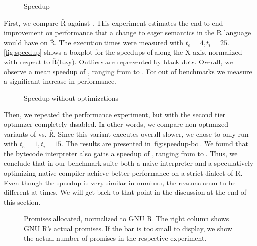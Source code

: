 \documentclass[review,creen,acmsmall]{acmart}
\renewcommand{\Rsh}{{\sf\v R}\xspace}
\begin{document}
\begin{figure}[h]
  \centering 
  \caption{Speedup} \label{fig:speedup}
\end{figure}

First, we compare \Rsh against \rshstrict. This experiment estimates the
end-to-end improvement on performance that a change to eager semantics in the R
language would have on \Rsh. The execution times were measured with $t_e = 4,
t_i = 25$. \autoref{fig:speedup} shows a boxplot for the speedups of \rshstrict
along the X-axis, normalized with respect to \Rsh (lazy). Outliers are
represented by black dots. Overall, we observe a mean speedup of
\speedupRshStrict, ranging from \speedupRshStrictMin to \speedupRshStrictMax.
For \speedupRshStrictSignificant out of \benchmarkSuiteSize benchmarks we
measure a significant increase in performance.
%
\begin{figure}[h]
  \centering
  
  \caption{Speedup without optimizations}
  \label{fig:speedup-bc}
\end{figure}
%

Then, we repeated the performance experiment, but with the second tier optimizer
completely disabled. In other words, we compare non optimized variants of
\rshstrict vs. \Rsh. Since this variant executes overall \rshBCSlowdown slower,
we chose to only run with $t_e = 1, t_i = 15$. The results are presented in
\autoref{fig:speedup-bc}. We found that the bytecode interpreter also gains a
speedup of \speedupBCRshStrict, ranging from \speedupBCRshStrictMin to
\speedupBCRshStrictMax.
%
Thus, we conclude that in our benchmark suite both a naive interpreter and a
speculatively optimizing native compiler achieve better performance on a strict
dialect of R. Even though the speedup is very similar in numbers, the reasons
seem to be different at times. We will get back to that point in the discussion
at the end of this section.


\begin{figure}[h]
  \centering
  
  \caption{Promises allocated, normalized to GNU R. The right column shows GNU R's actual promises. If the bar is too small to display, we show the actual number of promises in the respective experiment.}
  \label{fig:gc-pressure}
\end{figure}
\end{document}
